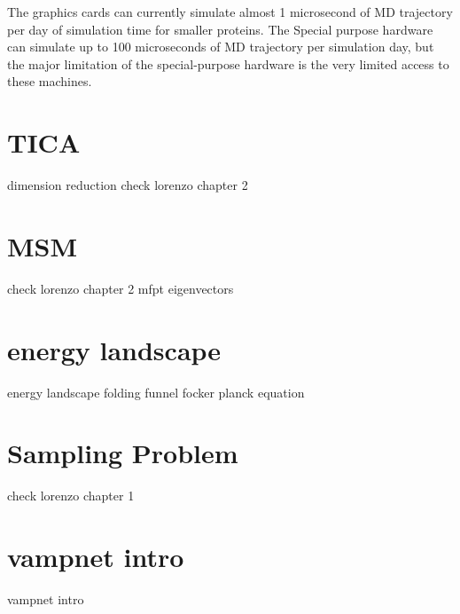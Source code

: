The graphics cards can currently simulate almost 1 microsecond of MD trajectory per day of simulation time for smaller proteins. The Special purpose hardware can simulate up to 100 microseconds of MD trajectory per simulation day, but the major limitation of the special-purpose hardware is the very limited access to these machines. 

\section{TICA}
dimension reduction
check  lorenzo chapter 2



\section{MSM}
check  lorenzo chapter 2
mfpt
eigenvectors

\section{energy landscape }
energy landscape 
folding funnel
focker planck equation
\section{Sampling Problem}
check  lorenzo chapter 1


\section{vampnet intro}
vampnet intro
